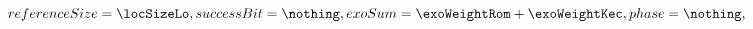 \begin{description}
\[{				%
				referenceSize     = \locSizeLo                           ,
				successBit        = \nothing                             ,
				exoSum            = \exoWeightRom + \exoWeightKec        ,
				phase             = \nothing                             ,
				}
\]
\end{description}
